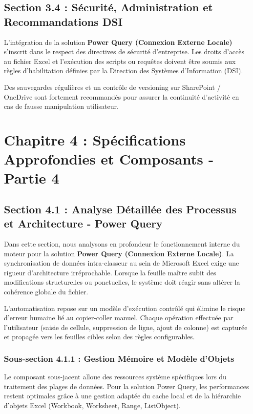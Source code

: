 \documentclass[12pt,a4paper]{report}
\begin{document}
\section{Section 3.4 : Sécurité, Administration et Recommandations DSI}
L'intégration de la solution \textbf{Power Query (Connexion Externe Locale)} s'inscrit dans le respect des directives de sécurité d'entreprise. Les droits d'accès au fichier Excel et l'exécution des scripts ou requêtes doivent être soumis aux règles d'habilitation définies par la Direction des Systèmes d'Information (DSI).

Des sauvegardes régulières et un contrôle de versioning sur SharePoint / OneDrive sont fortement recommandés pour assurer la continuité d'activité en cas de fausse manipulation utilisateur.


\chapter{Chapitre 4 : Spécifications Approfondies et Composants - Partie 4}

\section{Section 4.1 : Analyse Détaillée des Processus et Architecture - Power Query}
Dans cette section, nous analysons en profondeur le fonctionnement interne du moteur pour la solution \textbf{Power Query (Connexion Externe Locale)}. La synchronisation de données intra-classeur au sein de Microsoft Excel exige une rigueur d'architecture irréprochable. Lorsque la feuille maître subit des modifications structurelles ou ponctuelles, le système doit réagir sans altérer la cohérence globale du fichier.

L'automatisation repose sur un modèle d'exécution contrôlé qui élimine le risque d'erreur humaine lié au copier-coller manuel. Chaque opération effectuée par l'utilisateur (saisie de cellule, suppression de ligne, ajout de colonne) est capturée et propagée vers les feuilles cibles selon des règles configurables.


\subsection{Sous-section 4.1.1 : Gestion Mémoire et Modèle d'Objets}
Le composant sous-jacent alloue des ressources système spécifiques lors du traitement des plages de données. Pour la solution Power Query, les performances restent optimales grâce à une gestion adaptée du cache local et de la hiérarchie d'objets Excel (Workbook, Worksheet, Range, ListObject).
\end{document}
